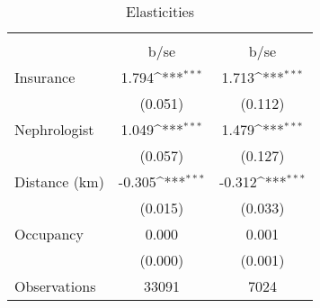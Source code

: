 \begin{table}[htbp]\centering
\def\sym#1{\ifmmode^{#1}\else\(^{#1}\)\fi}
\caption{Elasticities}
\begin{tabular}{l*{2}{c}}
\toprule
                    &\multicolumn{1}{c}{} &\multicolumn{1}{c}{} \\
                    &        b/se         &        b/se         \\
\midrule
Insurance           &       1.794\sym{***}&       1.713\sym{***}\\
                    &     (0.051)         &     (0.112)         \\
Nephrologist        &       1.049\sym{***}&       1.479\sym{***}\\
                    &     (0.057)         &     (0.127)         \\
Distance (km)       &      -0.305\sym{***}&      -0.312\sym{***}\\
                    &     (0.015)         &     (0.033)         \\
Occupancy           &       0.000         &       0.001         \\
                    &     (0.000)         &     (0.001)         \\
\midrule
Observations        &       33091         &        7024         \\
\bottomrule
\end{tabular}
\end{table}
